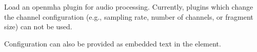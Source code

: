 Load an openmha plugin for audio processing. Currently, plugins which
change the channel configuration (e.g., sampling rate, number of
channels, or fragment size) can not be used.



Configuration can also be provided as embedded text in the
 element.

